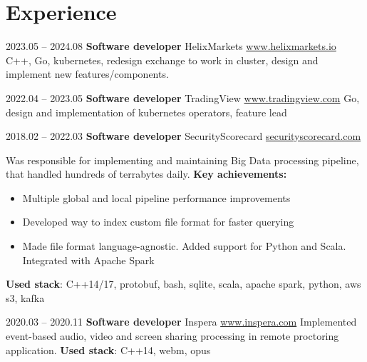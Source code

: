 \documentclass[11pt,a4paper]{moderncv}
\newcommand{\EngRus}[2]{#1}
\newcommand{\UsedStack}{\textbf{\EngRus{Used stack}{Используемый Стек}}: }
\newcommand{\WorkDate}[4]{\small{\EngRus{#2.#1 -- #4.#3}{#1.#2 -- #3.#4}}}
\begin{document}
\maketitle
\section{\EngRus{Experience}{Опыт}}
\cventry
{\WorkDate{05}{2023}{08}{2024}}
{\bfseries \EngRus{Software developer}{Разработчик ПО}}
{HelixMarkets \url{www.helixmarkets.io}}{}{}
{
  \EngRus{C++, Go, kubernetes, redesign exchange to work in cluster, design and implement new features/components. }
  {C++, Go, kubernetes, доработка биржи для работы в кластере, проектирование и разработка нового функционала и компонент. }
}

\cventry
{\WorkDate{04}{2022}{05}{2023}}
{\bfseries \EngRus{Software developer}{Разработчик ПО}}
{TradingView \url{www.tradingview.com}}{}{}
{
  \EngRus{Go, design and implementation of kubernetes operators, feature lead}
  {Go, проектирование и разработка операторов kubernetes, feature lead}
}

\cventry
{\WorkDate{02}{2018}{03}{2022}}
{\bfseries \EngRus{Software developer}{Разработчик ПО}}
{SecurityScorecard \url{securityscorecard.com}}{}{}
{
  \EngRus{Was responsible for implementing and maintaining Big Data processing pipeline, that handled hundreds of terrabytes daily.}
  {Разрабатывал и поддерживал пайплайн для больших данных, который обрабатывал сотни террабайт в день.}
  \newline{}\textbf{\EngRus{Key achievements}{Ключевые достижения}:}
  \begin{itemize}
    \item \EngRus{Multiple global and local pipeline performance improvements}{Множественные глобальные и локальные улучшения производительности пайплайна}
    \item \EngRus{Developed way to index custom file format for faster querying}{Реализовал индексацию файлов для быстрого поиска интересующих событий}
    \item \EngRus{Made file format language-agnostic. Added support for Python and Scala. Integrated with Apache Spark}
          {Упростил формат файла, добавил поддержку Python и Scala. Интегрировал формат с Apache Spark}
  \end{itemize}
  \UsedStack{} C++14/17, protobuf, bash, sqlite, scala, apache spark, python, aws s3, kafka
}

\cventry
{\WorkDate{03}{2020}{11}{2020}}
{\bfseries \EngRus{Software developer}{Разработчик ПО}}
{Inspera \url{www.inspera.com}}{}{}
{
  \EngRus{Implemented event-based audio, video and screen sharing processing in remote proctoring application.}
  {Реализовывал событийную обработку аудио, видео в приложении удалённого тестирования.}
  \newline{}\UsedStack{} C++14, webm, opus
}
\end{document}
